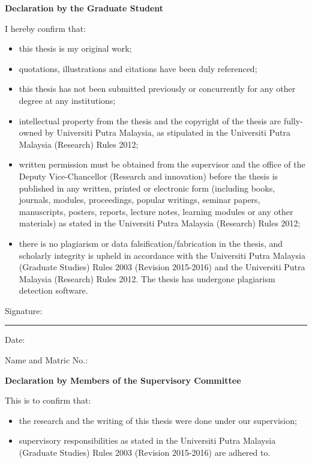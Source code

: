 
\textbf{Declaration by the Graduate Student}

\begin{minipage}{\linewidth}
   I hereby confirm that:
    \begin{itemize}[noitemsep, topsep=0pt, leftmargin=*]
        \item this thesis is my original work;
        \item quotations, illustrations and citations have been duly referenced;
        \item this thesis has not been submitted previously or concurrently for any other degree at any institutions;
        \item intellectual property from the thesis and the copyright of the thesis are fully-owned by Universiti Putra Malaysia, as stipulated in the Universiti Putra Malaysia (Research) Rules 2012;
        \item written permission must be obtained from the supervisor and the office of the Deputy Vice-Chancellor (Research and innovation) before the thesis is published in any written, printed or electronic form (including books, journals, modules, proceedings, popular writings, seminar papers, manuscripts, posters, reports, lecture notes, learning modules or any other materials) as stated in the Universiti Putra Malaysia (Research) Rules 2012;
        \item there is no plagiarism or data falsification/fabrication in the thesis, and scholarly integrity is upheld in accordance with the Universiti Putra Malaysia (Graduate Studies) Rules 2003 (Revision 2015-2016) and the Universiti Putra Malaysia (Research) Rules 2012. The thesis has undergone plagiarism detection software.
    \end{itemize} 
\end{minipage}

Signature: \rule{6cm}{0.4pt} Date: \hrulefill

Name and Matric No.: \hrulefill

\newpage

\textbf{Declaration by Members of the Supervisory Committee}

\begin{minipage}{\linewidth}
    This is to confirm that:
    \begin{itemize}[noitemsep, topsep=0pt, leftmargin=*]
        \item the research and the writing of this thesis were done under our supervision;
        \item supervisory responsibilities as stated in the Universiti Putra Malaysia (Graduate Studies) Rules 2003 (Revision 2015-2016) are adhered to.
    \end{itemize}
\end{minipage}

